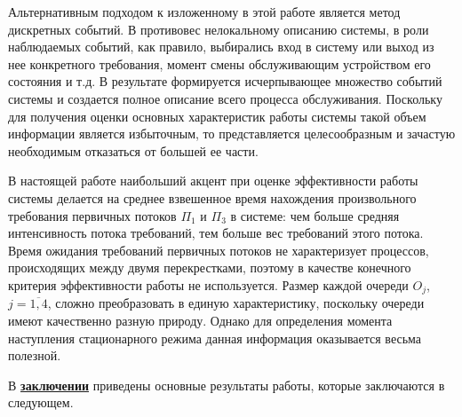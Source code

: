 Альтернативным подходом к изложенному в этой работе является метод дискретных событий. В противовес нелокальному описанию системы, в роли наблюдаемых событий, как правило, выбирались вход в систему или выход из нее конкретного требования, момент смены обслуживающим устройством его состояния и т.д. В результате формируется исчерпывающее множество событий системы и создается полное описание всего процесса обслуживания. Поскольку для получения оценки основных характеристик работы системы такой объем информации является избыточным, то представляется целесообразным и зачастую необходимым отказаться от большей ее части.

В настоящей работе наибольший акцент при оценке эффективности работы системы делается на среднее взвешенное время нахождения произвольного требования первичных потоков $\Pi_1$ и $\Pi_3$ в системе: чем больше средняя интенсивность потока требований, тем больше вес требований этого потока. Время ожидания требований первичных потоков не характеризует процессов, происходящих между двумя перекрестками, поэтому в качестве конечного критерия эффективности работы не используется. Размер каждой очереди $O_j$, $j=\overline{1,4}$, сложно преобразовать в единую характеристику, поскольку очереди имеют качественно разную природу. Однако для определения момента наступления стационарного режима данная информация оказывается весьма полезной.




 В \underline{\textbf{заключении}} приведены основные результаты работы, которые заключаются в следующем.


